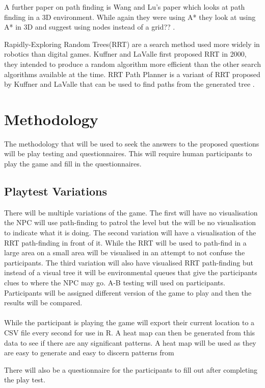 \documentclass[journal]{IEEEtran}
\begin{document}
A further paper on path finding is Wang and Lu's paper which looks at path finding in a 3D environment. While again they were using A* they look at using A* in 3D and suggest using nodes instead of a grid?? \cite{wang2012}.

Rapidly-Exploring Random Trees(RRT) are a search method used more widely in robotics than digital games\cite{Kuffner2000}. Kuffner and LaValle first proposed RRT in 2000, they intended to produce a random algorithm more efficient than the other search algorithms available at the time. RRT Path Planner is a variant of RRT proposed by Kuffner and LaValle that can be used to find paths from the generated tree \cite{Kuffner2000}.



\section{Methodology}
The methodology that will be used to seek the answers to the proposed questions will be play testing and questionnaires. This will require human participants to play the game and fill in the questionnaires. 

\subsection{Playtest Variations}
There will be multiple variations of the game. The first will have no visualisation the NPC will use path-finding to patrol the level but the will be no visualisation to indicate what it is doing.  The second variation will have a visualisation of the RRT path-finding in front of it. While the RRT will be used to path-find in a large area on a small area will be visualised in an attempt to not confuse the participants. The third variation will also have visualised RRT path-finding but instead of a visual tree it will be environmental queues that give the participants clues to where the NPC may go. A-B testing will used on participants. Participants will be assigned different version of the game to play and then the results will be compared. \\
\\
While the participant is playing the game will export their current location to a CSV file every second for use in R. A heat map can then be generated from this data to see if there are any significant patterns. A heat map will be used as they are easy to generate and easy to discern patterns from \cite{Wallner2015}

There will also be a questionnaire for the participants to fill out after completing the play test.
\end{document}
